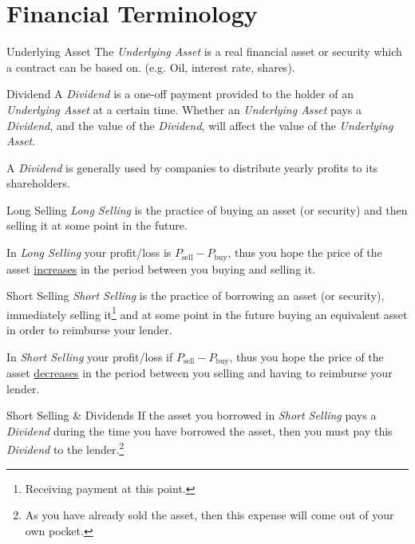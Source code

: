 \documentclass[11pt,a4paper]{article}
\begin{document}
\section{Financial Terminology}\label{sec_financial_terminology}

  \begin{definition}{Underlying Asset}
    The \textit{Underlying Asset} is a real financial asset or security which a contract can be based on. (e.g. Oil, interest rate, shares).
  \end{definition}

  \begin{definition}{Dividend}
    A \textit{Dividend} is a one-off payment provided to the holder of an \textit{Underlying Asset} at a certain time. Whether an \textit{Underlying Asset} pays a \textit{Dividend}, and the value of the \textit{Dividend}, will affect the value of the \textit{Underlying Asset}.
    \par A \textit{Dividend} is generally used by companies to distribute yearly profits to its shareholders.
  \end{definition}

  \begin{definition}{Long Selling}
    \textit{Long Selling} is the practice of buying an asset (or security) and then selling it at some point in the future.
    \par In \textit{Long Selling} your profit/loss is $P_{\text{sell}}-P_{\text{buy}}$, thus you hope the price of the asset \underline{increases} in the period between you buying and selling it.
  \end{definition}

  \begin{definition}{Short Selling}
    \textit{Short Selling} is the practice of borrowing an asset (or security), immediately selling it\footnote{Receiving payment at this point.} and at some point in the future buying an equivalent asset in order to reimburse your lender.
    \par In \textit{Short Selling} your profit/loss if $P_{\text{sell}}-P_{\text{buy}}$, thus you hope the price of the asset \underline{decreases} in the period between you selling and having to reimburse your lender.
  \end{definition}

  \begin{remark}{Short Selling \& Dividends}
    If the asset you borrowed in \textit{Short Selling} pays a \textit{Dividend} during the time you have borrowed the asset, then you must pay this \textit{Dividend} to the lender.\footnote{As you have already sold the asset, then this expense will come out of your own pocket.}
  \end{remark}
\end{document}
